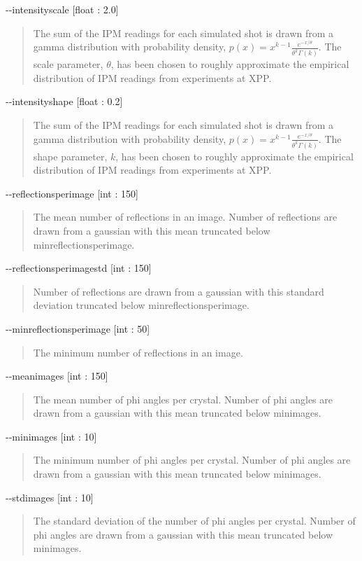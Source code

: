 \documentclass{report}
\begin{document}
\noindent
-{}-intensityscale [float : 2.0]
\begin{quote}
    The sum of the IPM readings for each simulated shot is drawn from a gamma distribution with probability density, 
    $p(x) = x^{k - 1} \frac {e^{-x/\theta}} {\theta^k \Gamma(k)}$. 
    The scale parameter, $\theta$, has been chosen to roughly approximate the empirical distribution of IPM readings from experiments at XPP. 
\end{quote}

\noindent
-{}-intensityshape [float : 0.2]
\begin{quote}
    The sum of the IPM readings for each simulated shot is drawn from a gamma distribution with probability density, 
    $p(x) = x^{k - 1} \frac {e^{-x/\theta}} {\theta^k \Gamma(k)}$. 
    The shape parameter, $k$, has been chosen to roughly approximate the empirical distribution of IPM readings from experiments at XPP. 
\end{quote}


\noindent
-{}-reflectionsperimage [int : 150]
\begin{quote}
    The mean number of reflections in an image. 
    Number of reflections are drawn from a gaussian with this mean truncated below minreflectionsperimage.
\end{quote}

\noindent
-{}-reflectionsperimagestd [int : 150]
\begin{quote}
    Number of reflections are drawn from a gaussian with this standard deviation truncated below minreflectionsperimage.
\end{quote}

\noindent
-{}-minreflectionsperimage [int : 50]
\begin{quote}
    The minimum number of reflections in an image. 
\end{quote}

\noindent
-{}-meanimages [int : 150]
\begin{quote}
    The mean number of phi angles per crystal. 
    Number of phi angles are drawn from a gaussian with this mean truncated below minimages.
\end{quote}

\noindent
-{}-minimages [int : 10]
\begin{quote}
    The minimum number of phi angles per crystal. 
    Number of phi angles are drawn from a gaussian with this mean truncated below minimages.
\end{quote}

\noindent
-{}-stdimages [int : 10]
\begin{quote}
    The standard deviation of the number of phi angles per crystal. 
    Number of phi angles are drawn from a gaussian with this mean truncated below minimages.
\end{quote}
\end{document}
